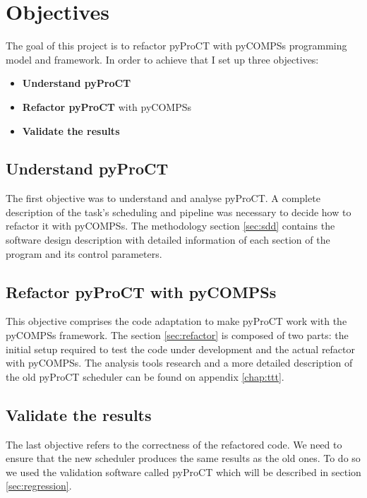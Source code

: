 \chapter{Objectives}

The goal of this project is to refactor pyProCT with pyCOMPSs programming model and framework. In order to achieve that I set up three objectives:

\begin{itemize}
\item \textbf{Understand pyProCT} 
\item \textbf{Refactor pyProCT} with pyCOMPSs
\item \textbf{Validate the results}
\end{itemize}


\section{Understand pyProCT}

The first objective was to understand and analyse pyProCT. A complete description of the task's scheduling and pipeline was necessary to decide how to refactor it with pyCOMPSs. The methodology section \ref{sec:sdd} contains the software design description with detailed information of each section of the program and its control parameters.

\section {Refactor pyProCT with pyCOMPSs}

This objective comprises the code adaptation to make pyProCT work with the pyCOMPSs framework. The section \ref{sec:refactor} is composed of two parts: the initial setup required to test the code under development and the actual refactor with pyCOMPSs. The analysis tools research and a more detailed description of the old pyProCT scheduler can be found on appendix \ref{chap:ttt}.

\section{Validate the results}
 
The last objective refers to the correctness of the refactored code. We need to ensure that the new scheduler produces the same results as the old ones. To do so we used the validation software called pyProCT which will be described in section \ref{sec:regression}.